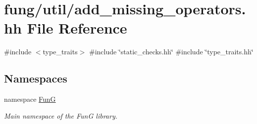 \hypertarget{add__missing__operators_8hh}{\section{fung/util/add\-\_\-missing\-\_\-operators.hh \-File \-Reference}
\label{add__missing__operators_8hh}
}
{\ttfamily \#include $<$type\-\_\-traits$>$}\*
{\ttfamily \#include \char`\"{}static\-\_\-checks.\-hh\char`\"{}}\*
{\ttfamily \#include \char`\"{}type\-\_\-traits.\-hh\char`\"{}}\*
\subsection*{\-Namespaces}
\begin{DoxyCompactItemize}
\item 
namespace \hyperlink{namespaceFunG}{\-Fun\-G}
\begin{DoxyCompactList}\small\item\em \-Main namespace of the \-Fun\-G library. \end{DoxyCompactList}\end{DoxyCompactItemize}
